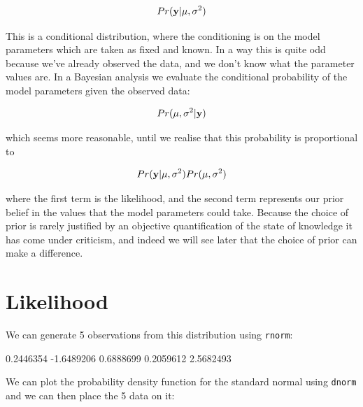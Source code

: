 \documentclass{article}
\begin{document}
\begin{displaymath}
Pr({\bf y} | \mu, \sigma^{2})
\end{displaymath}

This is a conditional distribution, where the conditioning is on the model parameters which are taken as fixed and known. In a way this is quite odd because we've already observed the data, and we don't know what the parameter values are. In a Bayesian analysis we evaluate the conditional probability of the model parameters given the observed data:

\begin{displaymath}
Pr(\mu, \sigma^{2} | {\bf y})
\label{post1-eq}
\end{displaymath}
 
which seems more reasonable, until we realise that this probability is proportional to 

\begin{displaymath}
Pr({\bf y} | \mu, \sigma^{2})Pr(\mu, \sigma^{2})
\end{displaymath}

where the first term is the likelihood, and the second term represents our prior belief in the values that the model parameters could take. Because the choice of prior is rarely justified by an objective quantification of the state of knowledge it has come under criticism, and indeed we will see later that the choice of prior can make a difference. 

\section{Likelihood}

We can generate 5 observations from this distribution using \texttt{rnorm}:

\begin{Schunk}
\begin{Soutput}
[1]  0.2446354 -1.6489206  0.6888699  0.2059612  2.5682493
\end{Soutput}
\end{Schunk}

We can plot the probability density function for the standard normal using \texttt{dnorm} and we can then place the 5 data on it:
\end{document}
